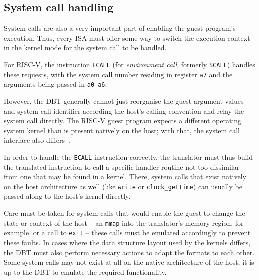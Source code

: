 



\subsection{System call handling}
\label{sec:syscall-handling}
System calls are also a very important part of enabling the guest program's execution.
Thus, every ISA must offer some way to switch the execution context in the kernel mode for the system call to be handled.

For RISC-V, the instruction \texttt{ECALL} (for \textit{environment call}, formerly \texttt{SCALL}) handles these requests, with the system call number residing in register \texttt{a7} and the arguments being passed in \texttt{a0--a6}.

However, the DBT generally cannot just reorganise the guest argument values and system call identifier according the host's calling convention and relay the system call directly.
The RISC-V guest program expects a different operating system kernel than is present natively on the host;
with that, the system call interface also differs~\cite[S. 3]{bintrans}.

In order to handle the \texttt{ECALL} instruction correctly, the translator must thus build the translated instruction to call a specific handler routine not too dissimilar from one that may be found in a kernel.
There, system calls that exist natively on the host architecture as well (like \texttt{write} or \texttt{clock\_gettime}) can usually be passed along to the host's kernel directly.

Care must be taken for system calls that would enable the guest to change the state or context of the host -- an \texttt{mmap} into the translator's memory region, for example, or a call to \texttt{exit} -- these calls must be emulated accordingly to prevent these faults.
In cases where the data structure layout used by the kernels differs, the DBT must also perform necessary actions to adapt the formats to each other.
Some system calls may not exist at all on the native architecture of the host, it is up to the DBT to emulate the required functionality.


















